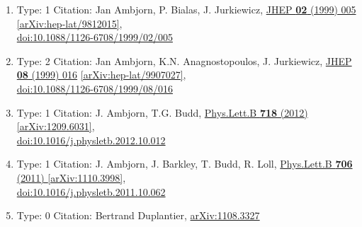 \documentclass[a4paper,10pt]{article}
\begin{document}
\begin{enumerate}
\begin{enumerate}
  \item Type: 1 Citation: Jan Ambjorn, P. Bialas, J. Jurkiewicz, \href{https://www.doi.org/10.1088/1126-6708/1999/02/005}{JHEP {\bf 02} (1999) 005}  \href{https://arxiv.org/abs/hep-lat/9812015}{[arXiv:hep-lat/9812015]},\\\href{https://www.doi.org/10.1088/1126-6708/1999/02/005}{doi:10.1088/1126-6708/1999/02/005}
  \item Type: 2 Citation: Jan Ambjorn, K.N. Anagnostopoulos, J. Jurkiewicz, \href{https://www.doi.org/10.1088/1126-6708/1999/08/016}{JHEP {\bf 08} (1999) 016}  \href{https://arxiv.org/abs/hep-lat/9907027}{[arXiv:hep-lat/9907027]},\\\href{https://www.doi.org/10.1088/1126-6708/1999/08/016}{doi:10.1088/1126-6708/1999/08/016}
  \item Type: 1 Citation: J. Ambjorn, T.G. Budd, \href{https://www.doi.org/10.1016/j.physletb.2012.10.012}{Phys.Lett.B {\bf 718} (2012) }  \href{https://arxiv.org/abs/1209.6031}{[arXiv:1209.6031]},\\\href{https://www.doi.org/10.1016/j.physletb.2012.10.012}{doi:10.1016/j.physletb.2012.10.012}
  \item Type: 1 Citation: J. Ambjorn, J. Barkley, T. Budd, R. Loll, \href{https://www.doi.org/10.1016/j.physletb.2011.10.062}{Phys.Lett.B {\bf 706} (2011) }  \href{https://arxiv.org/abs/1110.3998}{[arXiv:1110.3998]},\\\href{https://www.doi.org/10.1016/j.physletb.2011.10.062}{doi:10.1016/j.physletb.2011.10.062}
  \item Type: 0 Citation: Bertrand Duplantier, \href{https://arxiv.org/abs/1108.3327}{arXiv:1108.3327}

\end{enumerate}
\end{enumerate}
\end{document}
